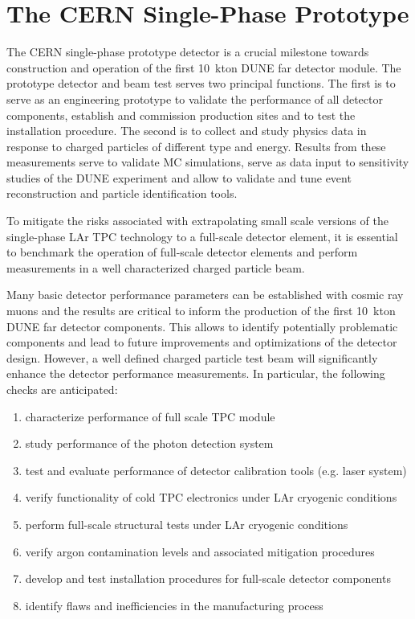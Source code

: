 \section{The CERN Single-Phase Prototype} 
\label{sec:proto-cern-single}


The CERN single-phase prototype detector is a crucial milestone
towards construction and operation of the first 10~kton DUNE far
detector module. The prototype detector and beam test serves two
principal functions.  The first is to serve as an engineering
prototype to validate the performance of all detector components,
establish and commission production sites and to test the installation
procedure.  The second is to collect and study physics data in
response to charged particles of different type and energy.  Results
from these measurements serve to validate MC simulations, serve as
data input to sensitivity studies of the DUNE experiment and allow to
validate and tune event reconstruction and particle identification
tools.

To mitigate the risks associated with extrapolating small scale
versions of the single-phase LAr TPC technology to a full-scale
detector element, it is essential to benchmark the operation of
full-scale detector elements and perform measurements in a well
characterized charged particle beam.


Many basic detector performance parameters can be established with
cosmic ray muons and the results are critical to inform the production
of the first 10~kton DUNE far detector components. This allows to
identify potentially problematic components and lead to future
improvements and optimizations of the detector design. However, a
well defined charged particle test beam will significantly enhance the
detector performance measurements.  In particular, the following
checks are anticipated:
\begin{enumerate}
 \item characterize performance of full scale TPC module
 \item study performance of the photon detection system
 \item test and evaluate performance of detector calibration tools (e.g. laser system)
  \item verify functionality of cold TPC electronics under LAr cryogenic conditions
  \item perform full-scale structural tests under LAr cryogenic conditions
  \item verify argon contamination levels and associated mitigation procedures
  \item develop and test installation procedures for full-scale detector components
  \item identify flaws and inefficiencies in the manufacturing process
\end{enumerate}

